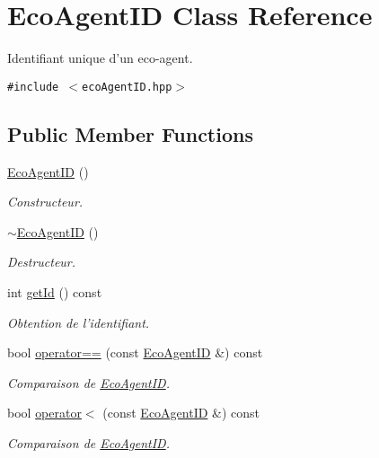 \hypertarget{classEcoAgentID}{
\section{EcoAgentID Class Reference}
\label{classEcoAgentID}
}
Identifiant unique d'un eco-agent.  


{\tt \#include $<$ecoAgentID.hpp$>$}

\subsection*{Public Member Functions}
\begin{CompactItemize}
\item 
\hyperlink{classEcoAgentID_9c337e2ad56912db99193c03d1f82c56}{EcoAgentID} ()
\begin{CompactList}\small\item\em Constructeur. \item\end{CompactList}\item 
\hyperlink{classEcoAgentID_97da1c0ae8891bbf10feb0574ef64a26}{$\sim$EcoAgentID} ()
\begin{CompactList}\small\item\em Destructeur. \item\end{CompactList}\item 
int \hyperlink{classEcoAgentID_30abc8a92bd07523b8e4f4baf312b56e}{getId} () const 
\begin{CompactList}\small\item\em Obtention de l'identifiant. \item\end{CompactList}\item 
bool \hyperlink{classEcoAgentID_a6c183361e0ccdab9da2c6666d77c111}{operator==} (const \hyperlink{classEcoAgentID}{EcoAgentID} \&) const 
\begin{CompactList}\small\item\em Comparaison de \hyperlink{classEcoAgentID}{EcoAgentID}. \item\end{CompactList}\item 
bool \hyperlink{classEcoAgentID_24d44b31302cd2761ffce1df8f74f12c}{operator$<$} (const \hyperlink{classEcoAgentID}{EcoAgentID} \&) const 
\begin{CompactList}\small\item\em Comparaison de \hyperlink{classEcoAgentID}{EcoAgentID}. \item\end{CompactList}\end{CompactItemize}
